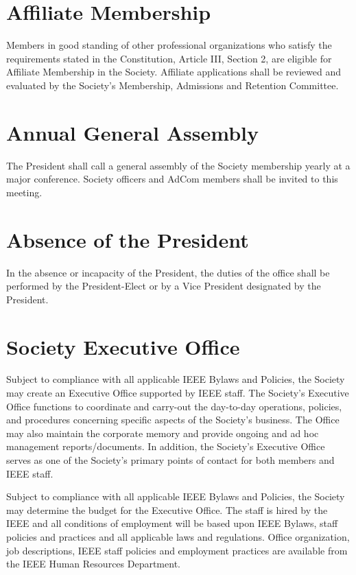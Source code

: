 \documentclass[10pt]{article}
\begin{document}
\section{Affiliate Membership}

Members in good standing of other professional organizations who satisfy the requirements stated in the Constitution, Article III, Section 2, are eligible for Affiliate Membership in the Society. Affiliate applications shall be reviewed and evaluated by the Society's Membership, Admissions and Retention Committee.

\section{Annual General Assembly}

The President shall call a general assembly of the Society membership yearly at a major conference.  Society officers and AdCom members shall be invited to this meeting.


\section{Absence of the President}

In the absence or incapacity of the President, the duties of the office shall be performed by the President-Elect or by a Vice President designated by the President.

\section{Society Executive Office}

Subject to compliance with all applicable IEEE Bylaws and Policies, the Society may create an Executive Office supported by IEEE staff.  The Society’s Executive Office functions to coordinate and carry-out the day-to-day operations, policies, and procedures concerning specific aspects of the Society’s business.  The Office may also maintain the corporate memory and provide ongoing and ad hoc management reports/documents.  In addition, the Society’s Executive Office serves as one of the Society’s primary points of contact for both members and IEEE staff. 

Subject to compliance with all applicable IEEE Bylaws and Policies, the Society may determine the budget for the Executive Office.  The staff is hired by the IEEE and all conditions of employment will be based upon IEEE Bylaws, staff policies and practices and all applicable laws and regulations.  Office organization, job descriptions, IEEE staff policies and employment practices are available from the IEEE Human Resources Department.  
\end{document}
